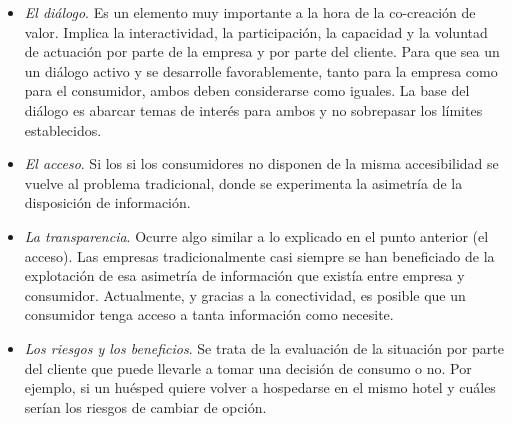 \begin{itemize} 
			\item \emph{El diálogo}. Es un elemento muy importante a la hora de la co-creación de valor. Implica la interactividad, la participación, la capacidad y la voluntad de actuación por parte de la empresa y por parte del cliente. Para que sea un un diálogo activo y se desarrolle favorablemente, tanto para la empresa como para el consumidor, ambos deben considerarse como iguales. La base del diálogo es abarcar temas de interés para ambos y no sobrepasar los límites establecidos. 
			\item \emph{El acceso}. Si los si los consumidores no disponen de la misma accesibilidad se vuelve al problema tradicional, donde se experimenta la asimetría de la disposición de información. 
			\item \emph{La transparencia}. Ocurre algo similar a lo explicado en el punto anterior (el acceso). Las empresas tradicionalmente casi siempre se han beneficiado de la explotación de esa asimetría de información que existía entre empresa y consumidor. Actualmente, y gracias a la conectividad, es posible que un consumidor tenga acceso a tanta información como necesite. 
			\item \emph{Los riesgos y los beneficios}. Se trata de la evaluación de la situación por parte del cliente que puede llevarle a tomar una decisión de consumo o no. Por ejemplo, si un huésped quiere volver a hospedarse en el mismo hotel y cuáles serían los riesgos de cambiar de opción. 

\end{itemize}

